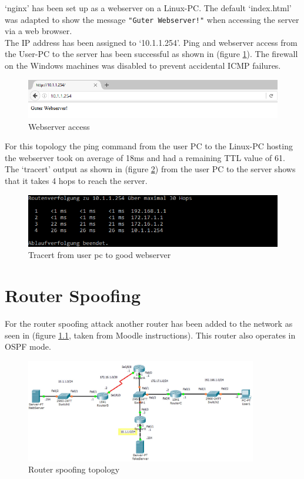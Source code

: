`nginx' has been set up as a webserver on a Linux-PC. The default `index.html' was adapted to show the message \texttt{"Guter Webserver!"} when accessing the server via a web browser. \\
The IP address has been assigned to `10.1.1.254'.
Ping and webserver access from the User-PC to the server has been successful as shown in (figure \ref{img:GuterWebserverScreenshot}). The firewall on the Windows machines was disabled to prevent accidental ICMP failures.

\begin{figure}[H]
	\centering
	\includegraphics[width=1.0\textwidth]{img/GuterWebserverScreenshot.png}
	\caption{Webserver access}
	\label{img:GuterWebserverScreenshot}
\end{figure}

For this topology the ping command from the user PC to the Linux-PC hosting the webserver took on average of 18ms and had a remaining \ac{TTL} value of 61.
The `tracert' output as shown in (figure \ref{img:TracertGuterWebserver}) from the user PC to the server shows that it takes 4 hops to reach the server.

\begin{figure}[H]
	\centering
	\includegraphics[width=1.0\textwidth]{img/TracertGuterWebserver.png}
	\caption{Tracert from user pc to good webserver}
	\label{img:TracertGuterWebserver}
\end{figure}

\chapter{Router Spoofing}

For the router spoofing attack another router has been added to the network as seen in (figure \ref{img:Router spoofing topology}, taken from Moodle instructions). This router also operates in \ac{OSPF} mode. 

\begin{figure}[H]
	\centering
	\includegraphics[width=0.9\textwidth]{img/topo_spoofing.png}
	\caption{Router spoofing topology}
	\label{img:Router spoofing topology}
\end{figure}


